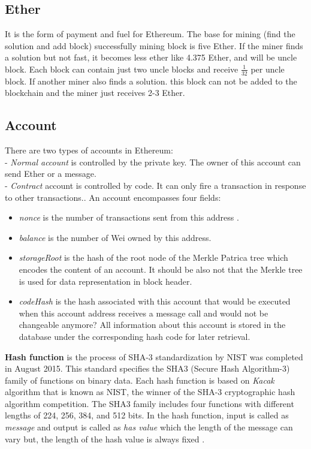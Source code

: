 \subsection{Ether}
 It is the form of payment and fuel for Ethereum. The base for mining (find the solution and add block) successfully mining block is five Ether. If the miner finds a solution but not fast, it becomes less ether like 4.375 Ether, and will be uncle block. Each block can contain just two uncle blocks and receive $\frac{1}{32}$ per uncle block. If another miner also finds a solution. this block can not be added to the blockchain and the miner just receives 2-3 Ether\cite{Egbertsen}. 
\subsection{Account}
There are two types of accounts in Ethereum:\\
- \textit{Normal account} is controlled by the private key. The owner of this account can send Ether or a message.\\
- \textit{Contract} account is controlled by code. It can only fire a transaction in response to other transactions.\cite{Egbertsen}. An account encompasses four fields:\\
 \begin{itemize}
     \item \textit{nonce} is the number of transactions sent from this address \cite{Gavin}.
     \item \textit{balance} is the number of Wei owned by this address\cite{Gavin}.
     \item \textit{storageRoot} is the hash of the root node of the Merkle Patrica tree which encodes the content of an account. It should be also not that the Merkle tree is used for data representation in block header\cite{Gavin}.
     \item \textit{codeHash}
     is the hash associated with this account that would be executed when this account address receives a message call and would not be changeable anymore? All information about this account is stored in the database under the corresponding hash code for later retrieval\cite{Gavin}. \\
    
\end{itemize}
\textbf{Hash function}
is the process of SHA-3 standardization by NIST was completed in August 2015.
This standard specifies the SHA3 (Secure Hash Algorithm-3) family of functions on binary data. Each hash function is based on \textit{Kacak} algorithm that is known as NIST, the winner of the SHA-3 cryptographic hash algorithm competition. The SHA3 family includes four functions with different lengths of 224, 256, 384, and 512 bits. 
In the hash function, input is called as \textit{message} and output is called as  \textit{has value} which the length of the message can vary but, the length of the hash value is always fixed \cite{Fips}.\\

